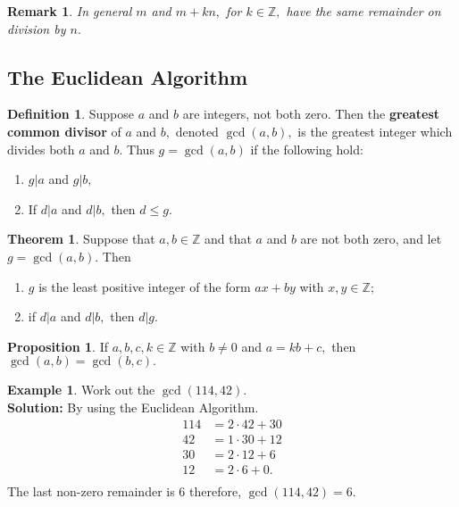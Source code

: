 \documentclass[12pt, a4paper]{article}
\newcommand{\bb}[1]{\mathbb{#1}}
\newtheorem*{remark}{Remark}
\theoremstyle{definition}
\newtheorem{definition}{Definition}[section]
\newtheorem{theorem}{Theorem}[section]
\newtheorem*{example}{Example}
\newtheorem{proposition}{Proposition}
\theoremstyle{plain}
\begin{document}
\begin{remark}
In general $m$ and $m+kn,$ for $k\in \bb{Z},$ have the same remainder on division by $n.$
\end{remark}

\subsection{The Euclidean Algorithm}

\begin{definition}
Suppose $a$ and $b$ are integers, not both zero. Then the \textbf{greatest common divisor} of $a$ and $b,$ denoted $\gcd(a,b),$ is the greatest integer which divides both $a$ and $b.$ Thus $g = \gcd(a, b)$ if the following hold:
\begin{enumerate}
	
	\item $g|a$ and $g|b,$

	\item If $d|a$ and $d|b,$ then $d\leq g.$

\end{enumerate}
\end{definition}

\begin{theorem}
Suppose that $a,b \in \bb{Z}$ and that $a$ and $b$ are not both zero, and let $g=\gcd(a,b).$ Then 
\begin{enumerate}
	
	\item $g$ is the least positive integer of the form $ax+by$ with $x,y \in \bb{Z};$

	\item if $d|a$ and $d|b,$ then $d|g.$

\end{enumerate}
\end{theorem}

\begin{proposition}
If $a,b,c,k \in \bb{Z}$ with $b\neq 0$ and $a=kb+c,$ then $\gcd(a,b)=\gcd(b,c).$
\end{proposition}

\begin{example}\label{example:Euclidean Algorithm gcd}
Work out the $\gcd(114,42).$ \\
\textbf{Solution:} By using the Euclidean Algorithm.
$$\begin{aligned}
114 &= 2\cdot 42 +30 \\
42 &=1\cdot 30 +12 \\
30 &=2\cdot 12 +6 \\
12 &=2\cdot 6 +0. \\
\end{aligned}$$ 
The last non-zero remainder is $6$ therefore, $\gcd(114,42)=6.$
\end{example}
\end{document}
